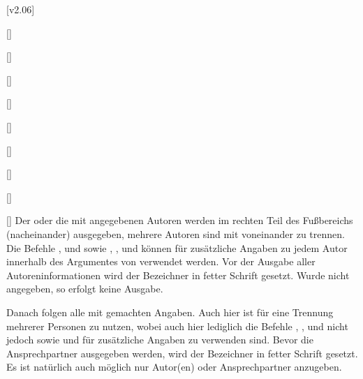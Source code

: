 \begin{Bundle*}[v2.05]{}
[v2.06]
\begin{Declaration}{[]}
\begin{Declaration}{[]}
\begin{Declaration}{[]}
\begin{Declaration}{[]}
\begin{Declaration}{[]}
\begin{Declaration}{[]}
\begin{Declaration}{[]}
\begin{Declaration}{[]}
\begin{Declaration}{[]}
\printdeclarationlist%
%
Der oder die mit  angegebenen Autoren werden im rechten Teil des 
Fußbereichs (nacheinander) ausgegeben, mehrere Autoren sind mit  
voneinander zu trennen. Die Befehle ,  und 
 sowie , ,  und 
 können für zusätzliche Angaben zu jedem Autor innerhalb 
des Argumentes von  verwendet werden. Vor der Ausgabe aller 
Autoreninformationen wird der Bezeichner  in fetter Schrift 
gesetzt. Wurde  nicht angegeben, so erfolgt keine Ausgabe. 

Danach folgen alle mit  gemachten Angaben. Auch hier ist 
 für eine Trennung mehrerer Personen zu nutzen, wobei auch hier 
lediglich die Befehle , ,  und 
 nicht jedoch  sowie  und 
 für zusätzliche Angaben zu verwenden sind. Bevor die 
Ansprechpartner ausgegeben werden, wird der Bezeichner  
in fetter Schrift gesetzt. Es ist natürlich auch möglich nur Autor(en) oder 
Ansprechpartner anzugeben.
\end{Declaration}
\end{Declaration}
\end{Declaration}
\end{Declaration}
\end{Declaration}
\end{Declaration}
\end{Declaration}
\end{Declaration}
\end{Declaration}


\end{Bundle*}
